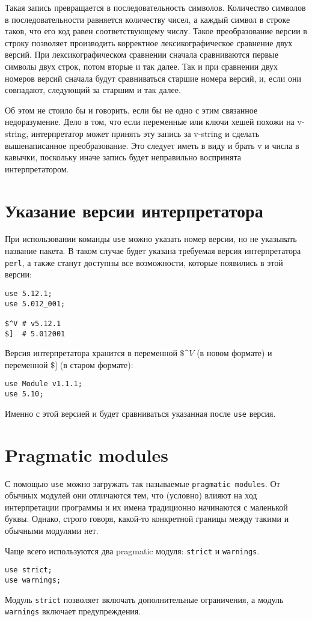 Такая запись превращается в последовательность символов. Количество символов в последовательности равняется количеству чисел, а каждый символ в строке таков, что его код равен соответствующему числу. Такое преобразование версии в строку позволяет производить корректное лексикографическое сравнение двух версий. При лексикографическом сравнении сначала сравниваются первые символы двух строк, потом вторые и так далее. Так и при сравнении двух номеров версий сначала будут сравниваться старшие номера версий, и, если они совпадают, следующий за старшим и так далее.

Об этом не стоило бы и говорить, если бы не одно с этим связанное недоразумение. Дело в том, что если переменные или ключи хешей похожи на v-string, интерпретатор может принять эту запись за v-string и сделать вышенаписанное преобразование. Это следует иметь в виду и брать v и числа в кавычки, поскольку иначе запись будет неправильно воспринята интерпретатором.

\section{Указание версии интерпретатора}
При использовании команды \verb|use| можно указать номер версии, но не указывать название пакета. В таком случае будет указана требуемая версия интерпретатора \verb|perl|, а также станут доступны все возможности, которые появились в этой версии:
\begin{verbatim}
use 5.12.1;
use 5.012_001;

$^V # v5.12.1
$]  # 5.012001
\end{verbatim}
Версия интерпретатора хранится в переменной $\$\^V$ (в новом формате) и переменной $\$]$ (в старом формате):
\begin{verbatim}
use Module v1.1.1;
use 5.10;
\end{verbatim}
Именно с этой версией и будет сравниваться указанная после \verb|use| версия.

\section{Pragmatic modules} %
С помощью \verb|use| можно загружать так называемые \verb|pragmatic modules|. От обычных модулей они отличаются тем, что (условно) влияют на ход интерпретации программы и их имена традиционно начинаются с маленькой буквы. Однако, строго говоря, какой-то конкретной границы между такими и обычными модулями нет.

Чаще всего используются два pragmatic модуля: \verb|strict| и \verb|warnings|.
\begin{verbatim}
use strict;
use warnings;
\end{verbatim}
Модуль \verb|strict| позволяет включать дополнительные ограничения, а модуль \verb|warnings| включает предупреждения.

